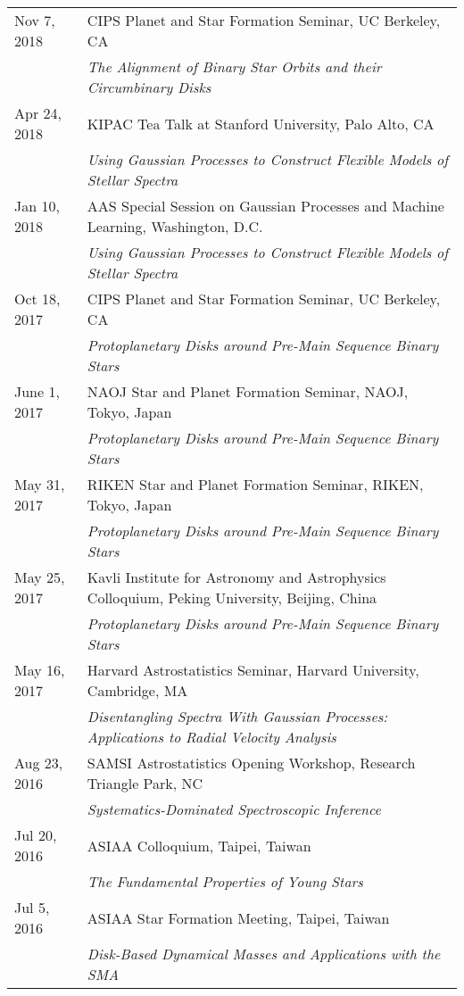 \begin{longtable}{@{\hspace{10pt}}p{1.2in}l}
  Nov 7, 2018 & CIPS Planet and Star Formation Seminar, UC Berkeley, CA  \\
  & \emph{The Alignment of Binary Star Orbits and their Circumbinary Disks} \\[\rowskip]
  Apr 24, 2018 & KIPAC Tea Talk at Stanford University, Palo Alto, CA \\
  & \emph{Using Gaussian Processes to Construct Flexible Models of Stellar Spectra} \\[\rowskip]
  Jan 10, 2018 & AAS Special Session on Gaussian Processes and Machine Learning, Washington, D.C. \\
  & \emph{Using Gaussian Processes to Construct Flexible Models of Stellar Spectra}\\[\rowskip]
  Oct 18, 2017 & CIPS Planet and Star Formation Seminar, UC Berkeley, CA \\
  & \emph{Protoplanetary Disks around Pre-Main Sequence Binary Stars} \\[\rowskip]
  June 1, 2017 & NAOJ Star and Planet Formation Seminar, NAOJ, Tokyo, Japan \\
  & \emph{Protoplanetary Disks around Pre-Main Sequence Binary Stars} \\[\rowskip]
  May 31, 2017 & RIKEN Star and Planet Formation Seminar, RIKEN, Tokyo, Japan \\
  & \emph{Protoplanetary Disks around Pre-Main Sequence Binary Stars} \\[\rowskip]
  May 25, 2017 & Kavli Institute for Astronomy and Astrophysics Colloquium, Peking University, Beijing, China \\
  & \emph{Protoplanetary Disks around Pre-Main Sequence Binary Stars} \\[\rowskip]
  May 16, 2017 & Harvard Astrostatistics Seminar, Harvard University, Cambridge, MA \\
  & \emph{Disentangling Spectra With Gaussian Processes: Applications to Radial Velocity Analysis} \\[\rowskip]
  Aug 23, 2016 & SAMSI Astrostatistics Opening Workshop, Research Triangle Park, NC \\
  & \emph{Systematics-Dominated Spectroscopic Inference} \\[\rowskip]
  Jul 20, 2016 & ASIAA Colloquium, Taipei, Taiwan \\
  & \emph{The Fundamental Properties of Young Stars} \\[\rowskip]
  Jul 5, 2016 & ASIAA Star Formation Meeting, Taipei, Taiwan \\
  & \emph{Disk-Based Dynamical Masses and Applications with the SMA} \\[\rowskip]

\end{longtable}

